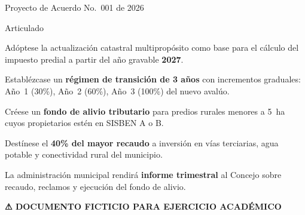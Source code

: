 \documentclass[aspectratio=169]{beamer}
\begin{document}
\begin{frame}{Proyecto de Acuerdo No.~001 de 2026}
  \scriptsize
  \begin{block}{Articulado}
    \begin{description}\itemsep3pt
      \item[\textcolor{navy}{Art.~1}] Adóptese la actualización catastral
      multipropósito como base para el cálculo del impuesto predial a
      partir del año gravable \textbf{2027}.

      \item[\textcolor{navy}{Art.~2}] Establézcase un \textbf{régimen de
      transición de 3 años} con incrementos graduales: Año~1 (30\%),
      Año~2 (60\%), Año~3 (100\%) del nuevo avalúo.

      \item[\textcolor{navy}{Art.~3}] Créese un \textbf{fondo de alivio
      tributario} para predios rurales menores a 5~ha cuyos propietarios
      estén en SISBEN A o B.

      \item[\textcolor{navy}{Art.~4}] Destínese el \textbf{40\% del mayor
      recaudo} a inversión en vías terciarias, agua potable y
      conectividad rural del municipio.

      \item[\textcolor{navy}{Art.~5}] La administración municipal rendirá
      \textbf{informe trimestral} al Concejo sobre recaudo, reclamos y
      ejecución del fondo de alivio.
    \end{description}
  \end{block}
  \vspace{0.3em}
  {\color{accent}\textbf{\scriptsize ⚠ DOCUMENTO FICTICIO PARA EJERCICIO
  ACADÉMICO}}
\end{frame}
\end{document}
